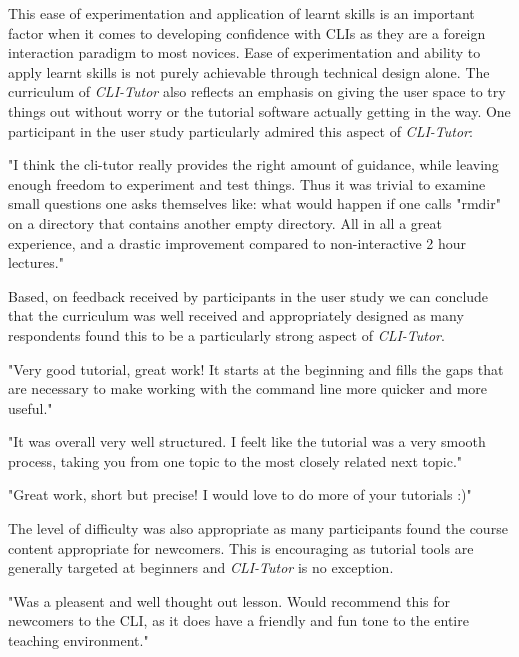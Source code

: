 This ease of experimentation and application of learnt skills is an
important factor when it comes to developing confidence with CLIs as they are a
foreign interaction paradigm to most novices. Ease of experimentation and
ability to apply learnt skills is not purely achievable through technical
design alone. The curriculum of \textit{CLI-Tutor} also reflects an emphasis on
giving the user space to try things out without worry or the tutorial software
actually getting in the way. One participant in the user study particularly
admired this aspect of \textit{CLI-Tutor}: 

\begin{quotes}
	"I think the cli-tutor really provides the right amount of guidance, while
	leaving enough freedom to experiment and test things. Thus it was trivial to
	examine small questions one asks themselves like:  what would happen if one
	calls "rmdir" on a directory that contains another empty directory.  All in all
	a great experience, and a drastic improvement compared to non-interactive  2
	hour lectures."
\end{quotes}

Based, on feedback received by participants in the user study we can conclude
that the curriculum was well received and appropriately designed as many
respondents found this to be a particularly strong aspect of
\textit{CLI-Tutor}.

\begin{quotes}
	"Very good tutorial, great work! It starts at the beginning and fills the gaps
	that are necessary to make working with the command line more quicker and more
	useful."
\end{quotes}

\begin{quotes}
	"It was overall very well structured. I feelt like the tutorial was a very
	smooth process, taking you from one topic to the most closely related next
	topic."
\end{quotes}

\begin{quotes}
	"Great work, short but precise! I would love to do more of your tutorials :)"
\end{quotes}

The level of difficulty was also appropriate as many participants found the
course content appropriate for newcomers. This is encouraging as tutorial tools
are generally targeted at beginners and \textit{CLI-Tutor} is no exception.

\begin{quotes}
	"Was a pleasent and well thought out lesson. Would recommend this for newcomers
	to the CLI, as it does have a friendly and fun tone to the entire teaching
	environment."
\end{quotes}

